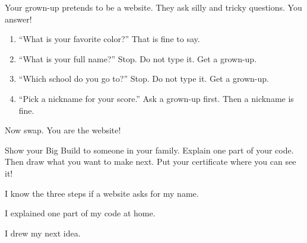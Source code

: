 
\begin{playathome}
Your grown-up pretends to be a website. They ask silly and tricky questions. You answer!
\begin{enumerate}[leftmargin=1.4em,itemsep=2pt]
  \item \enquote{What is your favorite color?} That is fine to say.
  \item \enquote{What is your full name?} Stop. Do not type it. Get a grown-up.
  \item \enquote{Which school do you go to?} Stop. Do not type it. Get a grown-up.
  \item \enquote{Pick a nickname for your score.} Ask a grown-up first. Then a nickname is fine.
\end{enumerate}
Now swap. You are the website!
\end{playathome}

\begin{playathome}
Show your Big Build to someone in your family. Explain one part of your code. Then draw what you want to make next. Put your certificate where you can see it!
\end{playathome}

\begin{selfcheck}
  \item I know the three steps if a website asks for my name.
  \item I explained one part of my code at home.
  \item I drew my next idea.
\end{selfcheck}
